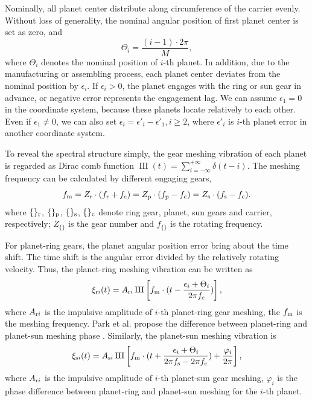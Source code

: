 \documentclass[a4paper,fleqn]{cas-sc}%
\begin{document}
\par Nominally, all planet center distribute along circumference of the carrier evenly. Without loss of generality, the nominal angular position of first planet center is set as zero, and
\begin{equation}
    \Theta_i=\frac{(i-1)\cdot 2\pi}{M},
\end{equation}
where $\Theta_i$ denotes the nominal position of $i$-th planet. In addition, due to the manufacturing or assembling process, each planet center deviates from the nominal position by $\epsilon_i$. If $\epsilon_i>0$, the planet engages with the ring or sun gear in advance, or negative error represents the engagement lag. We can assume $\epsilon_1=0$ in the coordinate system, because these planets locate relatively to each other. Even if $\epsilon_1 \neq 0$, we can also set $\epsilon_i=\epsilon'_i-\epsilon'_1,i \geq 2$, where $\epsilon'_i$ is $i$-th planet error in another coordinate system.
\par To reveal the spectral structure simply, the gear meshing vibration of each planet is regarded as Dirac comb function $\operatorname{III}(t)=\sum_{i=-\infty}^{+\infty}\delta(t-i)$. The meshing frequency can be calculated by different engaging gears,
\begin{equation}
    f_{\rm m}=Z_{\rm r} \cdot (f_{\rm r}+f_{\rm c})=Z_{\rm p} \cdot (f_{\rm p}-f_{\rm c})=Z_{\rm s} \cdot (f_{\rm s}-f_{\rm c}). \label{eq:meshing_frequency}
\end{equation}
where $\{\}_{\rm r}$, $\{\}_{\rm p}$, $\{\}_{\rm s}$, $\{\}_{\rm c}$ denote ring gear, planet, sun gears and carrier, respectively; $Z_{\{\}}$ is the gear number and $f_{\{\}}$ is the rotating frequency. 
\par For planet-ring gears, the planet angular position error bring about the time shift. The time shift is the angular error divided by the relatively rotating velocity. Thus, the planet-ring meshing vibration can be written as
\begin{equation}
    \xi_{{\rm r}i}(t)=A_{{\rm r}i}\operatorname{III}\left[f_{\rm m} \cdot (t-\frac{\epsilon_i+\Theta_i}{2 \pi f_{\rm c}})\right],\label{eq:planet-ring_meshing}
\end{equation}
where $A_{{\rm r}i}$ is the impulsive amplitude of $i$-th planet-ring gear meshing, the $f_{\rm m}$ is the meshing frequency. Park et al. propose the difference between planet-ring and planet-sun meshing phase \cite{Parker2004}. Similarly, the planet-sun meshing vibration is
\begin{equation}
    \xi_{{\rm s}i}(t)=A_{{\rm s}i} \operatorname{III}\left[f_{\rm m} \cdot (t + \frac{\epsilon_i+\Theta_i}{2 \pi f_{\rm s}- 2 \pi f_{\rm c}})+ \frac{\varphi_i}{2 \pi} \right],\label{eq:planet-sun_meshing}
\end{equation}
where $A_{{\rm r}i}$ is the impulsive amplitude of $i$-th planet-sun gear meshing, $\varphi_i$ is the phase difference between planet-ring and planet-sun meshing for the $i$-th planet.
\end{document}

